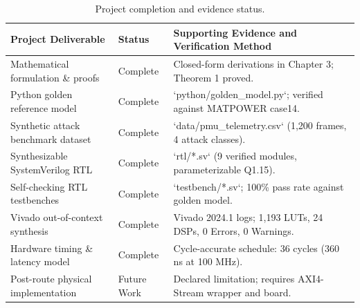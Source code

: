 \documentclass[12pt,a4paper]{report}
\begin{document}
\begin{table}[H]
\centering
\caption{Project completion and evidence status.}
\label{tab:project_status}
\small
\renewcommand{\arraystretch}{1.25}
\begin{tabular}{|p{4.4cm}|p{2.6cm}|p{7.4cm}|}
\hline
\textbf{Project Deliverable} & \textbf{Status} & \textbf{Supporting Evidence and Verification Method} \\
\hline
Mathematical formulation \& proofs & Complete & Closed-form derivations in Chapter 3; Theorem 1 proved. \\
\hline
Python golden reference model & Complete & `python/golden_model.py`; verified against MATPOWER case14. \\
\hline
Synthetic attack benchmark dataset & Complete & `data/pmu_telemetry.csv` (1,200 frames, 4 attack classes). \\
\hline
Synthesizable SystemVerilog RTL & Complete & `rtl/*.sv` (9 verified modules, parameterizable Q1.15). \\
\hline
Self-checking RTL testbenches & Complete & `testbench/*.sv`; 100\% pass rate against golden model. \\
\hline
Vivado out-of-context synthesis & Complete & Vivado 2024.1 logs; 1,193 LUTs, 24 DSPs, 0 Errors, 0 Warnings. \\
\hline
Hardware timing \& latency model & Complete & Cycle-accurate schedule: 36 cycles (360 ns at 100 MHz). \\
\hline
Post-route physical implementation & Future Work & Declared limitation; requires AXI4-Stream wrapper and board. \\
\hline
\end{tabular}
\end{table}

\end{document}
